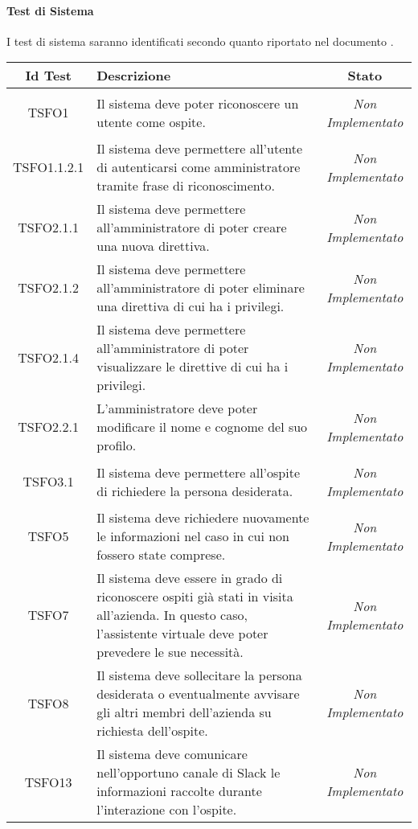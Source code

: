 \paragraph{Test di Sistema}
I test di sistema saranno identificati secondo quanto riportato nel documento \NPdoc{}.
\normalsize
\begin{longtable}{|c|>{}m{8cm}|c|}
\hline
\textbf{Id Test} & \textbf{Descrizione} & \textbf{Stato}\\
\hline
\endhead
\hypertarget{TSFO1}{TSFO1} & Il sistema deve poter riconoscere un utente come ospite. & \textit{Non Implementato}\\ \hline
\hypertarget{TSFO1.1.2.1}{TSFO1.1.2.1} & Il sistema deve permettere all'utente di autenticarsi come amministratore tramite frase di riconoscimento. & \textit{Non Implementato}\\ \hline
\hypertarget{TSFO2.1.1}{TSFO2.1.1} & Il sistema deve permettere all'amministratore di poter creare una nuova direttiva. & \textit{Non Implementato}\\ \hline
\hypertarget{TSFO2.1.2}{TSFO2.1.2} & Il sistema deve permettere all'amministratore di poter eliminare una direttiva di cui ha i privilegi. & \textit{Non Implementato}\\ \hline
\hypertarget{TSFO2.1.4}{TSFO2.1.4} & Il sistema deve permettere all'amministratore di poter visualizzare le direttive di cui ha i privilegi. & \textit{Non Implementato}\\ \hline
\hypertarget{TSFO2.2.1}{TSFO2.2.1} & L'amministratore deve poter modificare il nome e cognome del suo profilo. & \textit{Non Implementato}\\ \hline
\hypertarget{TSFO3.1}{TSFO3.1} & Il sistema deve permettere all'ospite di richiedere la persona desiderata. & \textit{Non Implementato}\\ \hline
\hypertarget{TSFO5}{TSFO5} & Il sistema deve richiedere nuovamente le informazioni nel caso in cui non fossero state comprese. & \textit{Non Implementato}\\ \hline
\hypertarget{TSFO7}{TSFO7} & Il sistema deve essere in grado di riconoscere ospiti già stati in visita all'azienda. In questo caso, l'assistente virtuale deve poter prevedere le sue necessità. & \textit{Non Implementato}\\ \hline
\hypertarget{TSFO8}{TSFO8} & Il sistema deve sollecitare la persona desiderata o eventualmente avvisare gli altri membri dell'azienda su richiesta dell'ospite. & \textit{Non Implementato}\\ \hline
\hypertarget{TSFO13}{TSFO13} & Il sistema deve comunicare nell'opportuno canale di Slack le informazioni raccolte durante l'interazione con l'ospite. & \textit{Non Implementato}\\ \hline

\end{longtable}
